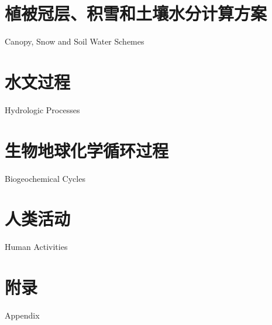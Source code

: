\documentclass[a4paper,12pt,twoside]{report}
\begin{document}
\part{植被冠层、积雪和土壤水分计算方案}{Canopy, Snow and Soil Water Schemes}\label{part:SPC}




\part{水文过程}{Hydrologic Processes}\label{part:hydro}

%





\part{生物地球化学循环过程}{Biogeochemical Cycles}\label{part:BGC}






\part{人类活动}{Human Activities}\label{part:human}





\clearpage
{} %
\part*{附录}{Appendix}

\appendix
\clearpage



\clearpage
\renewcommand{\bibname}{参考文献}



%
\end{document}
